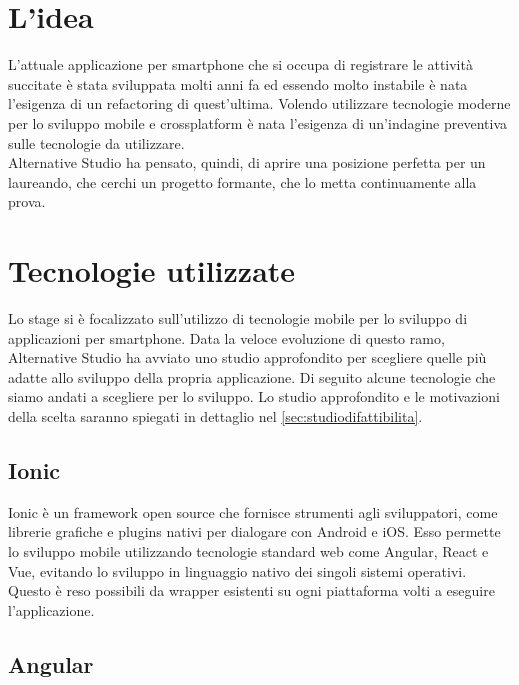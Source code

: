 \section{L'idea}

L'attuale applicazione per smartphone che si occupa di registrare le attività succitate è stata sviluppata molti anni fa ed essendo molto
instabile è nata l'esigenza di un refactoring di quest'ultima. Volendo utilizzare tecnologie moderne per lo sviluppo mobile e crossplatform
è nata l'esigenza di un'indagine preventiva sulle tecnologie da utilizzare. \\
Alternative Studio ha pensato, quindi, di aprire una posizione perfetta per un laureando, che cerchi un progetto formante, che lo metta continuamente alla prova.


\section{Tecnologie utilizzate}

Lo stage si è focalizzato sull'utilizzo di tecnologie mobile per lo sviluppo di applicazioni per smartphone. Data la veloce evoluzione di
questo ramo, Alternative Studio ha avviato uno studio approfondito per scegliere quelle più adatte allo sviluppo della
propria applicazione. Di seguito alcune tecnologie che siamo andati a scegliere per lo sviluppo. Lo studio approfondito e le motivazioni
della scelta saranno spiegati in dettaglio nel \autoref{sec:studiodifattibilita}.

\subsection{Ionic}

Ionic è un \gls{framework} open source che fornisce strumenti agli sviluppatori, come librerie grafiche e plugins nativi per dialogare
con \gls{Android} e \gls{iOS}. Esso permette lo sviluppo mobile utilizzando tecnologie standard web come Angular, React e Vue, evitando lo
sviluppo in linguaggio nativo dei singoli sistemi operativi. Questo è reso possibili da wrapper esistenti su ogni piattaforma volti a
eseguire l'applicazione.

\subsection{Angular}


